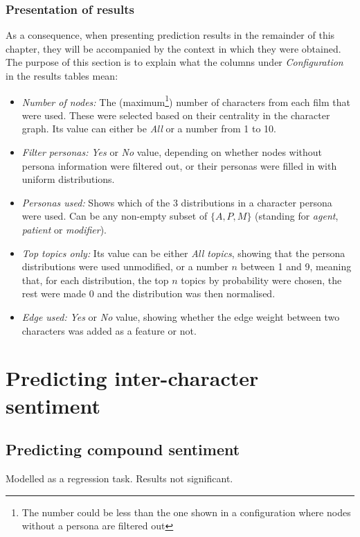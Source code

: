 \documentclass[bsc,frontabs,singlespacing,parskip]{infthesis} %
\begin{document}
\subsubsection{Presentation of results}
As a consequence, when presenting prediction results in the remainder of this chapter, they will be accompanied by the context in which they were obtained. The purpose of this section is to explain what the columns under \textit{Configuration} in the results tables mean:
\begin{itemize}
	\item \textit{Number of nodes:} The (maximum\footnote{The number could be less than the one shown in a configuration where nodes without a persona are filtered out}) number of characters from each film that were used. These were selected based on their centrality in the character graph. Its value can either be \textit{All} or a number from 1 to 10.
	\item \textit{Filter personas:} \textit{Yes} or \textit{No} value, depending on whether nodes without persona information were filtered out, or their personas were filled in with uniform distributions.
	\item \textit{Personas used:} Shows which of the 3 distributions in a character persona were used. Can be any non-empty subset of $\{A, P, M\}$ (standing for \textit{agent}, \textit{patient} or \textit{modifier}).
	\item \textit{Top topics only:} Its value can be either \textit{All topics}, showing that the persona distributions were used unmodified, or a number $n$ between 1 and 9, meaning that, for each distribution, the top $n$ topics by probability were chosen, the rest were made 0 and the distribution was then normalised.
	\item \textit{Edge used:} \textit{Yes} or \textit{No} value, showing whether the edge weight between two characters was added as a feature or not.
\end{itemize}

\section{Predicting inter-character sentiment}

\subsection{Predicting compound sentiment}
Modelled as a regression task. Results not significant.
\end{document}
